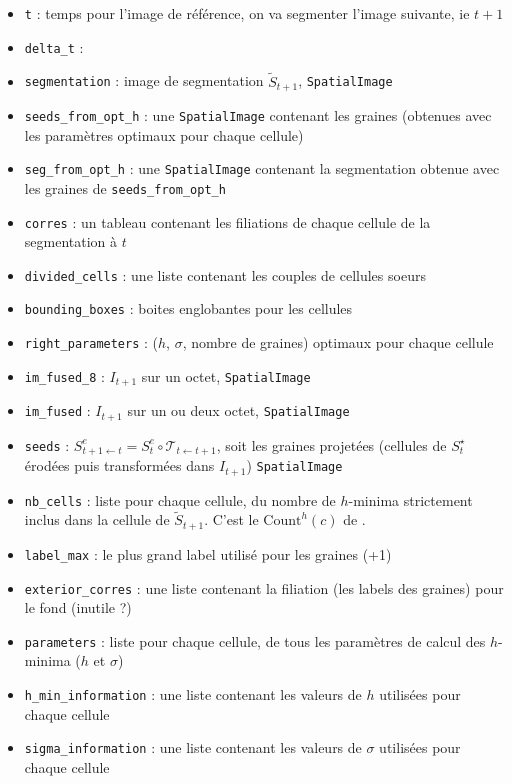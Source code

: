 \documentclass{article}
\begin{document}
\begin{itemize}
\itemsep -1ex
\item \verb|t| : temps pour l'image de r\'ef\'erence, on va segmenter l'image suivante, ie $t+1$
\item \verb|delta_t| : 
\item \verb|segmentation| : image de segmentation $\tilde{S}_{t+1}$, \texttt{SpatialImage}
\item \verb|seeds_from_opt_h| : une \texttt{SpatialImage} contenant les graines (obtenues avec les param\`etres optimaux pour chaque cellule)
\item \verb|seg_from_opt_h| : une \texttt{SpatialImage} contenant la segmentation obtenue avec les graines de \verb|seeds_from_opt_h| 
\item \verb|corres| : un tableau contenant les filiations de chaque cellule de la segmentation \`a $t$
\item \verb|divided_cells| : une liste contenant les couples de cellules soeurs
\item \verb|bounding_boxes| : boites englobantes pour les cellules
\item \verb|right_parameters| : ($h$, $\sigma$, nombre de graines) optimaux pour chaque cellule
\item \verb|im_fused_8| : $I_{t+1}$ sur un octet, \texttt{SpatialImage}
\item \verb|im_fused| : $I_{t+1}$ sur un ou deux octet, \texttt{SpatialImage}
\item \verb|seeds| : $S^e_{t+1 \leftarrow t} = S^e_t \circ \mathcal{T}_{t \leftarrow t+1}$, soit les graines projet\'ees (cellules de $S^{\star}_t$ \'erod\'ees puis transform\'ees dans $I_{t+1}$) \texttt{SpatialImage}
\item \verb|nb_cells| : liste pour chaque cellule, du nombre de $h$-minima strictement inclus dans la cellule de  $\tilde{S}_{t+1}$. C'est le $\mathrm{Count}^{h}(c)$ de \cite[section 2.3.3.5, page 71]{guignard:tel-01278725}.
\item \verb|label_max| :  le plus grand label utilisé pour les graines (+1)
\item \verb|exterior_corres| : une liste contenant la filiation (les labels des graines) pour le fond (inutile ?)
\item \verb|parameters| : liste pour chaque cellule,  de tous les param\`etres de calcul des $h$-minima ($h$ et $\sigma$)
\item \verb|h_min_information| : une liste contenant les valeurs de $h$ utilisées pour chaque cellule
\item \verb|sigma_information| : une liste contenant les valeurs de $\sigma$ utilisées pour chaque cellule

\end{itemize}
\end{document}
